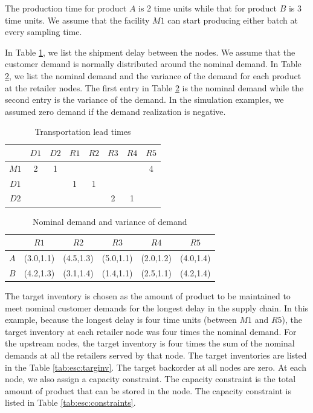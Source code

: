 \documentclass{elsarticle}
\theoremstyle{definition}
\begin{document}
The production time for product $A$ is 2 time units while that for product $B$ is 3 time units. We assume that the facility $M1$ can start producing either batch at every sampling time. 

In Table \ref{tab:esc:translead}, we list the shipment delay between
the nodes. We assume that the customer demand is normally distributed
around the nominal demand. In Table \ref{tab:esc:dem}, we list the
nominal demand and the variance  of the demand for each product at the
retailer nodes. The first entry in Table \ref{tab:esc:dem} is the
nominal demand while the second entry is the variance of the
demand. In the simulation examples, we assumed zero demand if the
demand realization is negative. 

\begin{table}
\caption{Transportation lead times}
\label{tab:esc:translead}
\centering
\begin{tabular}{cccccccc}\toprule
& $D1$ & $D2$  & $R1$ & $R2$ & $R3$ & $R4$ & $R5$ \\
\midrule
$M1$ &2&1& & & & &4\\
$D1$ & & &1&1& & & \\
$D2$ & & & & &2&1& \\
\bottomrule
\end{tabular}
\end{table}
\begin{table}
\caption{Nominal demand and variance of demand}
\centering
\begin{tabular}{cccccc}\toprule
\label{tab:esc:dem}
 &$R1$&$R2$&$R3$&$R4$&$R5$\\
\midrule
$A$&(3.0,1.1)&(4.5,1.3)&(5.0,1.1)&(2.0,1.2)&(4.0,1.4)\\
$B$&(4.2,1.3)&(3.1,1.4)&(1.4,1.1)&(2.5,1.1)&(4.2,1.4)\\
\bottomrule
\end{tabular}
\end{table}

The target inventory is chosen as the amount of product to be
maintained to meet nominal customer demands for the longest delay in
the supply chain. In this example, because the longest delay is four time
units (between $M1$ and $R5$), the target inventory at each retailer
node was four times the nominal demand. For the upstream nodes, the
target inventory is four times the sum of the nominal demands at all
the retailers served by that node.  The target inventories are
listed in the Table \ref{tab:esc:targinv}.  The target backorder at
all nodes are zero. At each node, we also assign a capacity
constraint. The capacity constraint is the total amount of product
that can be stored in the node. The capacity constraint is listed in
Table \ref{tab:esc:constraints}.   
\end{document}

